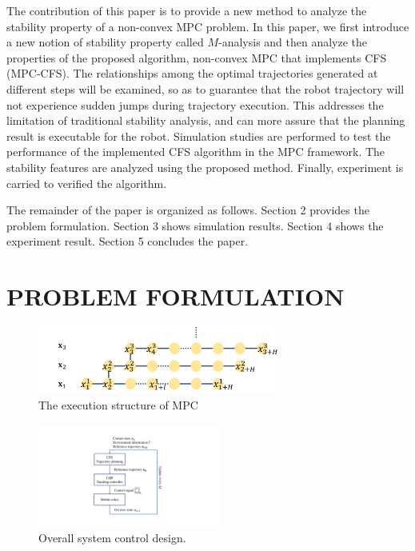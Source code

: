\documentclass[letterpaper, 10 pt, conference]{ieeeconf}  %
\begin{document}
The contribution of this paper is to provide a new method to analyze the stability property of a non-convex MPC problem. In this paper, we first introduce a new notion of stability property called $M$-analysis and then analyze the properties of the proposed algorithm,  non-convex MPC that implements CFS (MPC-CFS). The relationships among the optimal trajectories generated at different steps will be examined, so as to guarantee that the robot trajectory will not experience sudden jumps during trajectory execution. This addresses the limitation of traditional stability analysis, and can more assure that the planning result is executable for the robot. Simulation studies are performed to test the performance of the implemented CFS  algorithm in the MPC framework. The stability features are analyzed using the proposed method. Finally, experiment is carried to verified the algorithm.

The remainder of the paper is organized as follows. Section 2 provides the problem formulation. Section 3 shows simulation results. Section 4 shows the experiment result. Section 5 concludes the paper.

\section{PROBLEM FORMULATION}

\begin{figure}[t]
\begin{center}
\includegraphics[width=8cm]{src/MPCstruc.png}
\caption{The execution structure of MPC}
\label{fig: mpc}
\end{center}
\end{figure}

\begin{figure}[t]
      \centering
      \includegraphics[width=6cm]{plot/MPCsystem.pdf}
      \caption{Overall system control design. }
      \label{fig:MPCsystem}
\end{figure}
\end{document}
